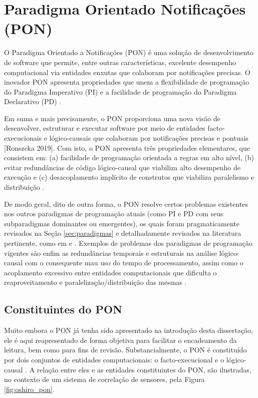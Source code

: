 \section{Paradigma Orientado Notificações (PON)}\label{sec:estado_arte_pon}

O Paradigma Orientado a Notificações (PON) é uma solução de desenvolvimento de
software que permite, entre outras características, excelente desempenho
computacional via entidades enxutas que colaboram por notificações precisas. O
inovador PON apresenta propriedades que unem a flexibilidade de programação do
Paradigma Imperativo (PI) e a facilidade de programação do Paradigma Declarativo
(PD) \cite{doc_ronszcka_2019,oshiro_2021}. 

Em suma e mais precisamente, o PON proporciona uma nova visão de desenvolver,
estruturar e executar software por meio de entidades facto-execucionais e
lógico-causais que colaboram por notificações precisas e pontuais [Ronszcka
2019]. Com isto, o PON apresenta três propriedades elementares, que consistem
em: (a) facilidade de programação orientada a regras em alto nível, (b) evitar
redundâncias de código lógico-causal que viabiliza alto desempenho de execução e
(c) desacoplamento implícito de construtos que viabiliza paralelismo e
distribuição \cite{doc_ronszcka_2019,oshiro_2021}.

De modo geral, dito de outra forma, o PON resolve certos problemas existentes
nos outros paradigmas de programação atuais (como PI e PD com seus subparadigmas
dominantes ou emergentes), os quais foram pragmaticamente revisados na Seção
\ref{sec:paradigmas} e detalhadamente revisados na literatura pertinente, como
em  e
. Exemplos de problemas dos paradigmas de
programação vigentes são enfim as redundâncias temporais e estruturais na
análise lógico-causal com o consequente mau uso do tempo de processamento, assim
como o acoplamento excessivo entre entidades computacionais que dificulta o
reaproveitamento e paralelização/distribuição das mesmas
\cite{pat_simao_2008,msc_Banaszewski_2009,doc_linhares_2015,msc_pordeus_2017,doc_Kerschbaumer_2018,doc_ronszcka_2019}.

\subsection{Constituintes do PON}

Muito embora o PON já tenha sido apresentado na introdução desta dissertação,
ele é aqui reapresentado de forma objetiva para facilitar o encadeamento da
leitura, bem como para fins de revisão. Substancialmente, o PON é constituído
por dois conjuntos de entidades computacionais: o facto-execucional e o
lógico-causal \cite{doc_ronszcka_2019,oshiro_2021}. A relação entre eles e as
entidades constituintes do PON, são ilustradas, no contexto de um sistema de
correlação de sensores, pela Figura \ref{fig:oshiro_pon}.

